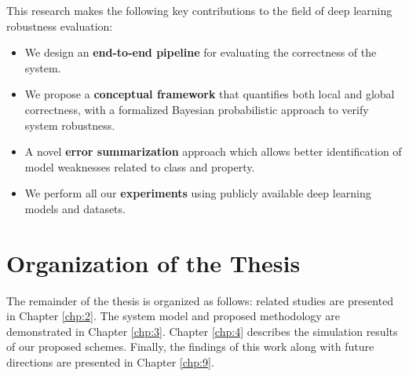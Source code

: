 This research makes the following key contributions to the field of deep learning robustness evaluation:
\begin{itemize}
    \item We design an \textbf{end-to-end pipeline} for evaluating the correctness of the system.
    \item We propose a \textbf{conceptual framework} that quantifies both local and global correctness, with a formalized Bayesian probabilistic approach to verify system robustness.
    \item A novel \textbf{error summarization} approach which allows better identification of model weaknesses related to class and property.
    \item We perform all our \textbf{experiments} using publicly available deep learning models and datasets.
\end{itemize}

\section{Organization of the Thesis}\hypertarget{organization of thesis}{}
The remainder of the thesis is organized as follows: related studies are presented in Chapter \ref{chp:2}. The system model and proposed methodology are demonstrated in Chapter \ref{chp:3}. Chapter \ref{chp:4} describes the simulation results of our proposed schemes. Finally, the findings of this work along with future directions are presented in Chapter \ref{chp:9}.

\clearpage
